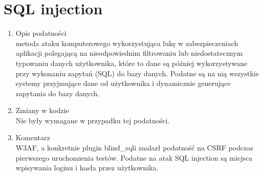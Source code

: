 \section{SQL injection}
\begin{enumerate}
\item Opis podatności\\
 metoda ataku komputerowego wykorzystująca lukę w zabezpieczeniach aplikacji polegającą na nieodpowiednim filtrowaniu lub niedostatecznym typowaniu danych użytkownika, które to dane są później wykorzystywane przy wykonaniu zapytań (SQL) do bazy danych. Podatne są na nią wszystkie systemy przyjmujące dane od użytkownika i dynamicznie generujące zapytania do bazy danych.
\item Zmiany w kodzie\\
Nie były wymagane w przypadku tej podatności.
\item Komentarz\\
W3AF, a konkretnie plugin blind\_sqli znalazł podatność na CSRF podczas pierwszego uruchomienia testów. Podatne na atak SQL injection są miejsca wpisywania loginu i hasła przez użytkownika.
\noindent
\begin{minipage}{\linewidth}
\label{erd}
\end{minipage}
\end{enumerate}
